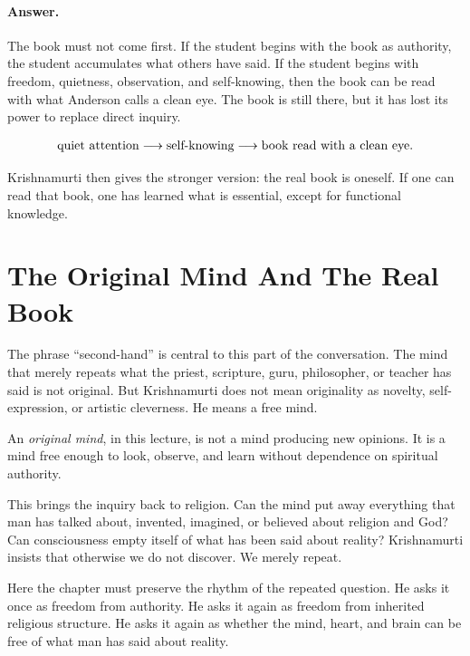 \paragraph{Answer.}
The book must not come first. If the student begins with the book as authority, the student accumulates what others have said. If the student begins with freedom, quietness, observation, and self-knowing, then the book can be read with what Anderson calls a clean eye. The book is still there, but it has lost its power to replace direct inquiry.

\begin{align}
\hbox{quiet attention}
\longrightarrow \hbox{self-knowing}
\longrightarrow \hbox{book read with a clean eye}.
\end{align}

Krishnamurti then gives the stronger version: the real book is oneself. If one can read that book, one has learned what is essential, except for functional knowledge.

\section{The Original Mind And The Real Book}

The phrase ``second-hand'' is central to this part of the conversation. The mind that merely repeats what the priest, scripture, guru, philosopher, or teacher has said is not original. But Krishnamurti does not mean originality as novelty, self-expression, or artistic cleverness. He means a free mind.

\begin{definition}
An \emph{original mind}, in this lecture, is not a mind producing new opinions. It is a mind free enough to look, observe, and learn without dependence on spiritual authority.
\end{definition}

This brings the inquiry back to religion. Can the mind put away everything that man has talked about, invented, imagined, or believed about religion and God? Can consciousness empty itself of what has been said about reality? Krishnamurti insists that otherwise we do not discover. We merely repeat.

Here the chapter must preserve the rhythm of the repeated question. He asks it once as freedom from authority. He asks it again as freedom from inherited religious structure. He asks it again as whether the mind, heart, and brain can be free of what man has said about reality.

